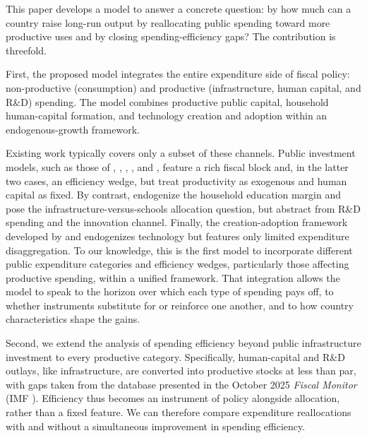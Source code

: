 \documentclass[a4paper,11pt]{article}
\begin{document}
This paper develops a model to answer a concrete question: by how much can a country raise long-run output by reallocating public spending toward more productive uses and by closing spending-efficiency gaps?
The contribution is threefold.

First, the proposed model integrates the entire expenditure side of fiscal policy: non-productive (consumption) and productive (infrastructure, human capital, and R\&D) spending.
The model combines productive public capital, household human-capital formation, and technology creation and adoption within an endogenous-growth framework.

Existing work typically covers only a subset of these channels.
Public investment models, such as those of \citet{coenen2012effects}, \citet{TraumYang2015}, \citet{DrautzburgUhlig2015}, \citet{bergetal2012public}, and \citet{marto2018building}, feature a rich fiscal block and, in the latter two cases, an efficiency wedge, but treat productivity as exogenous and human capital as fixed.
By contrast, \citet{Atoliaetal2021} endogenize the household education margin and pose the infrastructure-versus-schools allocation question, but abstract from R\&D spending and the innovation channel.
Finally, the creation-adoption framework developed by \citet{CominGertler2006} and \citet{Anzoateguietal2019} endogenizes technology but features only limited expenditure disaggregation.
To our knowledge, this is the first model to incorporate different public expenditure categories and efficiency wedges, particularly those affecting productive spending, within a unified framework.
That integration allows the model to speak to the horizon over which each type of spending pays off, to whether instruments substitute for or reinforce one another, and to how country characteristics shape the gains.

Second, we extend the analysis of spending efficiency beyond public infrastructure investment to every productive category. 
Specifically, human-capital and R\&D outlays, like infrastructure, are converted into productive stocks at less than par, with gaps taken from the database presented in the October 2025 \emph{Fiscal Monitor} (IMF \citeyear{IMF2025FM}).
Efficiency thus becomes an instrument of policy alongside allocation, rather than a fixed feature.
We can therefore compare expenditure reallocations with and without a simultaneous improvement in spending efficiency.
\end{document}
